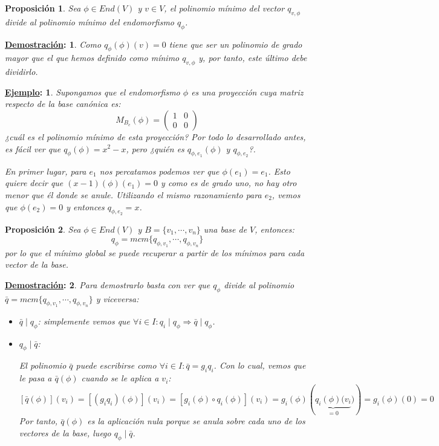 \documentclass[10pt,a4paper,openright]{book}
\theoremstyle{break}
\newtheorem*{prop}{Proposición}
\newtheorem*{demo}{\underline{Demostración}:}
\newtheorem*{ej}{\underline{Ejemplo}:}
\begin{document}
\begin{prop}
Sea $\phi\in End(V)$ y $v\in V$, el polinomio mínimo del vector $q_{v,\phi}$ divide al polinomio mínimo del endomorfismo $q_\phi$.
\end{prop}
\begin{demo}
Como $q_\phi(\phi)(v) = 0$ tiene que ser un polinomio de grado mayor que el que hemos definido como mínimo $q_{v,\phi}$ y, por tanto, este último debe dividirlo.
\end{demo}

\begin{ej}
Supongamos que el endomorfismo $\phi$ es una proyección cuya matriz respecto de la base canónica es:
$$
M_{B_c}(\phi)=\begin{pmatrix} 1 & 0 \\ 0 & 0\end{pmatrix}
$$
¿cuál es el polinomio mínimo de esta proyección? Por todo lo desarrollado antes, es fácil ver que $q_\phi(\phi)= x^2-x$, pero ¿quién es $q_{\phi,e_1}(\phi)$ y $q_{\phi, e_2}$?.

En primer lugar, para $e_1$ nos percatamos podemos ver que $\phi(e_1) = e_1$. Esto quiere decir que $(x-1)(\phi)(e_1) = 0$ y como es de grado uno, no hay otro menor que él donde se anule. Utilizando el mismo razonamiento para $e_2$, vemos que $\phi(e_2)=0$ y entonces $q_{\phi, e_2}=x$.
\end{ej}

\begin{prop}
Sea $\phi\in End(V)$ y $B=\{v_1, \cdots, v_n\}$ una base de $V$, entonces:
$$
q_\phi = mcm\{q_{\phi, v_1}, \cdots, q_{\phi, v_n}\}
$$
por lo que el mínimo global se puede recuperar a partir de los mínimos para cada vector de la base.
\end{prop}
\begin{demo}
Para demostrarlo basta con ver que $q_\phi$ divide al polinomio $\bar{q} = mcm\{q_{\phi, v_1}, \cdots, q_{\phi, v_n}\}$ y viceversa:
\begin{itemize}
\item $\bar{q} \mid q_\phi$: simplemente vemos que $\forall i \in I : q_i\mid q_\phi \Rightarrow \bar{q}\mid q_\phi $.

\item $q_\phi \mid \bar{q}$:

El polinomio $\bar{q}$ puede escribirse como $\forall i \in I :  \bar{q} = g_i q_i$. Con lo cual, vemos que le pasa a $\bar{q}(\phi)$ cuando se le aplica a $v_i$:
$$
\left[\bar{q}(\phi)\right](v_i)=\left[(g_iq_i)(\phi)\right](v_i)= [g_i(\phi)\circ q_i(\phi)](v_i)=g_i(\phi)\left(\underbrace{q_i(\phi)(v_i}_{=0})\right) = g_i(\phi)(0)=0
$$
Por tanto, $\bar{q}(\phi)$ es la aplicación nula porque se anula sobre cada uno de los vectores de la base, luego $q_\phi \mid \bar{q}$.
\end{itemize}
\end{demo}
\end{document}
